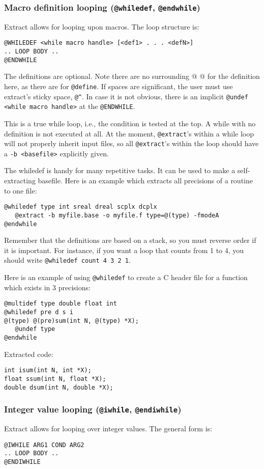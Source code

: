 \subsubsection{Macro definition looping ({\tt @whiledef}, {\tt @endwhile})}
\label{sec-whiledef}
Extract allows for looping upon macros.  The loop structure is:
\begin{verbatim}
@WHILEDEF <while macro handle> [<def1> . . . <defN>]
.. LOOP BODY ..
@ENDWHILE
\end{verbatim}
The definitions are optional.  Note there are no surrounding @ @ for the
definition here, as there are for {\tt @define}.  If 
spaces are significant, the user must use extract's sticky space, \verb+@^+.
In case it is not obvious, there is an implicit
{\tt @undef <while macro handle>} at the {\tt @ENDWHILE}.

This is a true while loop, i.e., the condition is tested at the top.  A
while with no definition is not executed at all.  At the moment,
{\tt @extract}'s within a while loop will not properly inherit input
files, so all {\tt @extract}'s within the loop should have a 
{\tt -b <basefile>} explicitly given.

The whiledef is handy for many repetitive tasks.  It can be used to make
a self-extracting basefile.
Here is an example which extracts all precisions of a routine to one file:
\begin{verbatim}
@whiledef type int sreal dreal scplx dcplx
   @extract -b myfile.base -o myfile.f type=@(type) -fmodeA
@endwhile
\end{verbatim}

Remember that the definitions are based on a stack, so you
must reverse order if it is important.  For instance, if you want
a loop that counts from 1 to 4, you should write 
{\tt @whiledef count 4 3 2 1}.

\noindent
Here is an example of using {\tt @whiledef} to create a C header file for
a function which exists in 3 precisions:
\begin{verbatim}
@multidef type double float int
@whiledef pre d s i
@(type) @(pre)sum(int N, @(type) *X);
   @undef type
@endwhile
\end{verbatim}

\noindent
Extracted code:
\begin{verbatim}
int isum(int N, int *X);
float ssum(int N, float *X);
double dsum(int N, double *X);
\end{verbatim}

\subsubsection{Integer value looping ({\tt @iwhile}, {\tt @endiwhile})}
\label{sec-iwhile}
Extract allows for looping over integer values.  The general form is:
\begin{verbatim}
@IWHILE ARG1 COND ARG2
.. LOOP BODY ..
@ENDIWHILE
\end{verbatim}


